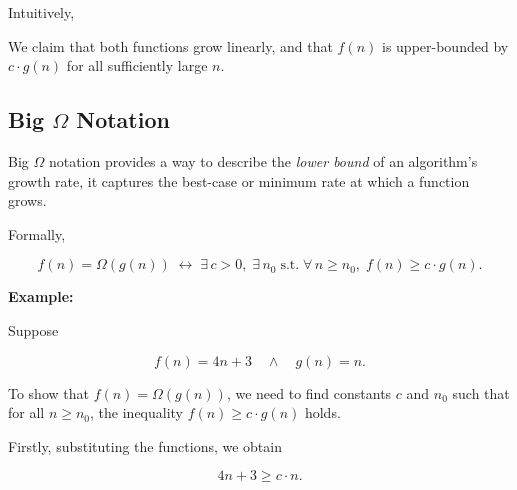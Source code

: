 \documentclass[12pt,a4paper,openany]{article}
\begin{document}
\newpage
Intuitively, 

\begin{figure}[h]
\centering
{}
\end{figure}

We claim that both functions grow linearly, and that $f(n)$ is upper-bounded by $c \cdot g(n)$ for all sufficiently large $n$.

\subsection{Big $\Omega$ Notation}

Big $\Omega$ notation provides a way to describe the \emph{lower bound} of an algorithm's growth rate, it captures the best-case or minimum rate at which a function grows.

Formally,

\[
f(n) = \Omega(g(n))
\;\leftrightarrow\;
\exists\, c > 0,\; \exists\, n_0
\;\text{s.t.}\;
\forall\, n \ge n_0,\;
f(n) \ge c \cdot g(n).
\]

\textbf{Example:}

Suppose

\[
f(n) = 4n + 3 \quad \land \quad g(n) = n.
\]

To show that \( f(n) = \Omega(g(n)) \), we need to find constants \( c \) and \( n_0 \) such that for all \( n \ge n_0 \), the inequality $f(n) \ge c \cdot g(n)$ holds.

Firstly, substituting the functions, we obtain

\[
4n + 3 \ge c \cdot n.
\]
\end{document}

